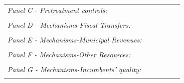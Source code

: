 \documentclass[12pt]{amsart}
\numberwithin{equation}{section}
\theoremstyle{definition}
\theoremstyle{definition}
\theoremstyle{definition}
\begin{document}
\begin{appendix}
\begin{table}[H]
{{\begin{tabular}{l*{1}{ccccc}}
\\
\emph{Panel C - Pretreatment controls:} 	&		&		&		&		\\



\\
\emph{Panel D - Mechanisms-Fiscal Transfers:} 	&		&		&		&		\\

\\
\emph{Panel E - Mechanisms-Municipal Revenues:} 	&		&		&		&		\\

\\
\emph{Panel F - Mechanisms-Other Resources:} 	&		&		&		&		\\

\\
\emph{Panel G - Mechanisms-Incumbents' quality:} 	&		&		&		&		\\

\\ 

\hline\hline
\end{tabular}    
}
}
\end{table} 
   
\clearpage

   
         

\end{appendix}
\end{document}
